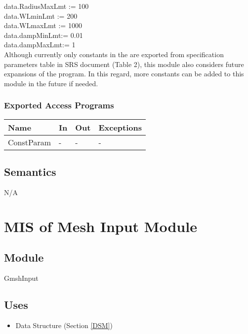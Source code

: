\documentclass[12pt, titlepage]{article}
\begin{document}
	data.RadiusMaxLmt := 100\\
	
	data.WLminLmt := 200\\
	
	data.WLmaxLmt := 1000\\
	
	data.dampMinLmt:= 0.01\\
	
	data.dampMaxLmt:= 1\\
	
	Although currently only constants in the \progname{} are exported from
	specification parameters table in SRS document (Table 2), this module also
	considers future expansions of the program. In this regard, more constants can
	be added to this module in the future if needed.
	
	\subsubsection{Exported Access Programs}
	
	\begin{center} \begin{tabular}{p{2cm} p{4cm} p{4cm} p{2cm}} \hline \textbf{Name}
			& \textbf{In} & \textbf{Out} & \textbf{Exceptions} \\ \hline ConstParam & - &
-
			& - \\ \hline \end{tabular} \end{center}
	
	\subsection{Semantics} N/A
	
	\newpage %
	
	\section{MIS of Mesh Input Module} \label{MIM}
	
	\subsection{Module} GmshInput
	
	\subsection{Uses} \begin{itemize} \item Data Structure (Section \ref{DSM})
		
	\end{itemize}
	
\end{document}
